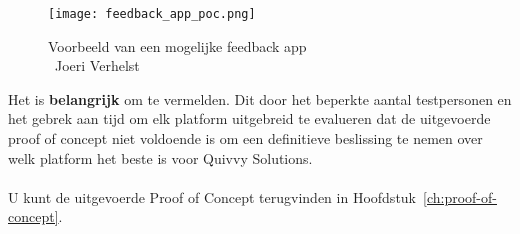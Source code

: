 \begin{figure}[H]
    \centering
    \texttt{[image: feedback\_app\_poc.png]}
    \caption[Voorbeeld van een mogelijke feedback app]{Voorbeeld van een mogelijke feedback app\\\textcopyright\ Joeri Verhelst}
    \label{fig:feedback_app}
\end{figure}
Het is \textbf{belangrijk} om te vermelden. Dit door het beperkte aantal testpersonen en het gebrek aan tijd om elk platform uitgebreid te evalueren dat 
de uitgevoerde proof of concept niet voldoende is om een definitieve beslissing te nemen over welk platform het beste is voor Quivvy Solutions.
\\
\\
U kunt de uitgevoerde Proof of Concept terugvinden in Hoofdstuk~\ref{ch:proof-of-concept}.









